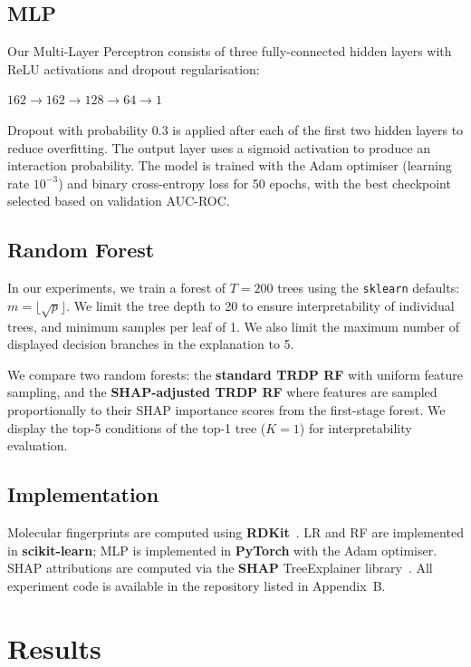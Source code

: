 \documentclass[letterpaper]{article} %
\begin{document}
\subsection{MLP}
Our Multi-Layer Perceptron consists of three fully-connected hidden layers with ReLU activations and dropout regularisation:

\begin{center}
    $162 \rightarrow 162 \rightarrow 128 \rightarrow 64 \rightarrow 1$
\end{center}

Dropout with probability 0.3 is applied after each of the first two hidden layers to reduce overfitting. The output layer uses a sigmoid activation to produce an interaction probability. The model is trained with the Adam optimiser (learning rate $10^{-3}$) and binary cross-entropy loss for 50 epochs, with the best checkpoint selected based on validation AUC-ROC.

\subsection{Random Forest}
 In our experiments, we train a forest of $T = 200$ trees using the \texttt{sklearn} defaults: $m = \lfloor\sqrt{p}\rfloor$. We limit the tree depth to 20 to ensure interpretability of individual trees, and minimum samples per leaf of 1. We also limit the maximum number of displayed decision branches in the explanation to 5.

We compare two random forests: the \textbf{standard TRDP RF} with uniform feature sampling, and the \textbf{SHAP-adjusted TRDP RF} where features are sampled proportionally to their SHAP importance scores from the first-stage forest. We display the top-5 conditions of the top-1 tree ($K=1$) for interpretability evaluation.

\subsection{Implementation}
Molecular fingerprints are computed using \textbf{RDKit}~\cite{rdkit}. LR and RF are implemented in \textbf{scikit-learn}; MLP is implemented in \textbf{PyTorch} with the Adam optimiser. SHAP attributions are computed via the \textbf{SHAP} TreeExplainer library~\cite{Lundberg2020}. All experiment code is available in the repository listed in Appendix~B.

\section{Results}
\end{document}
